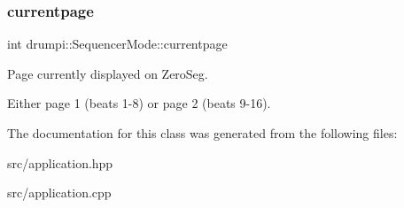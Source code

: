 \subsubsection{\texorpdfstring{currentpage}{currentpage}}
{\footnotesize\ttfamily int drumpi\+::\+Sequencer\+Mode\+::currentpage}



Page currently displayed on Zero\+Seg. 

Either page 1 (beats 1-\/8) or page 2 (beats 9-\/16). 

The documentation for this class was generated from the following files\+:\begin{DoxyCompactItemize}
\item 
src/application.\+hpp\item 
src/application.\+cpp\end{DoxyCompactItemize}
